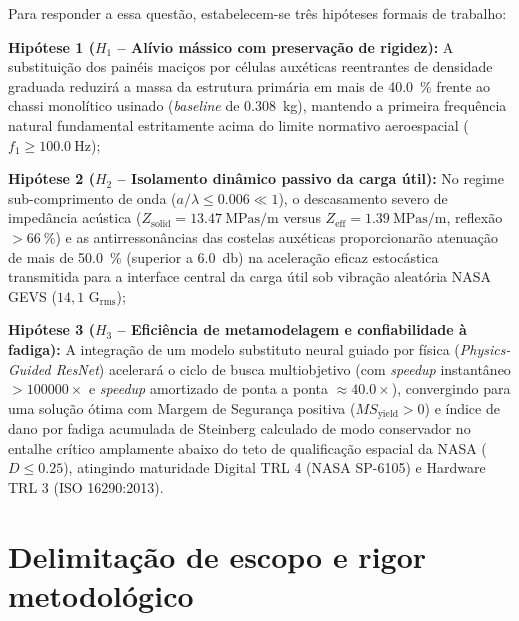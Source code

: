 Para responder a essa questão, estabelecem-se três hipóteses formais de trabalho:
\begin{alineas}
  \item \textbf{Hipótese 1 ($H_1$ -- Alívio mássico com preservação de rigidez):} A substituição dos painéis maciços por células auxéticas reentrantes de densidade graduada reduzirá a massa da estrutura primária em mais de \SI{40.0}{\percent} frente ao chassi monolítico usinado (\textit{baseline} de \SI{0.308}{\kilo\gram}), mantendo a primeira frequência natural fundamental estritamente acima do limite normativo aeroespacial ($f_1 \ge \SI{100.0}{\hertz}$);
  \item \textbf{Hipótese 2 ($H_2$ -- Isolamento dinâmico passivo da carga útil):} No regime sub-comprimento de onda ($a/\lambda \le \num{0.006} \ll 1$), o descasamento severo de impedância acústica ($Z_{\text{solid}} = \SI{13.47}{\mega\pascal\second\per\metre}$ versus $Z_{\text{eff}} = \SI{1.39}{\mega\pascal\second\per\metre}$, reflexão $> \SI{66}{\percent}$) e as antirressonâncias das costelas auxéticas proporcionarão atenuação de mais de \SI{50.0}{\percent} (superior a \SI{6.0}{\decibel}) na aceleração eficaz estocástica transmitida para a interface central da carga útil sob vibração aleatória NASA GEVS ($14{,}1\text{ G}_{\text{rms}}$);
  \item \textbf{Hipótese 3 ($H_3$ -- Eficiência de metamodelagem e confiabilidade à fadiga):} A integração de um modelo substituto neural guiado por física (\textit{Physics-Guided ResNet}) acelerará o ciclo de busca multiobjetivo (com \textit{speedup} instantâneo $> 100000\times$ e \textit{speedup} amortizado de ponta a ponta $\approx \num{40.0}\times$), convergindo para uma solução ótima com Margem de Segurança positiva ($MS_{\text{yield}} > 0$) e índice de dano por fadiga acumulada de Steinberg calculado de modo conservador no entalhe crítico amplamente abaixo do teto de qualificação espacial da NASA ($D \le \num{0.25}$), atingindo maturidade Digital TRL 4 (NASA SP-6105) e Hardware TRL 3 (ISO 16290:2013).
\end{alineas}

\section{Delimitação de escopo e rigor metodológico}
\label{sec:delimitacao}


